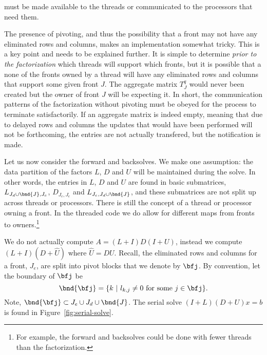 must be made available to the threads 
or communicated to the processors that need them.
\par
The presence of pivoting, and thus the possibility that a front may
not have any eliminated rows and columns, makes an implementation
somewhat tricky.
This is a key point and needs to be explained further.
It is simple to determine {\it prior to the factorization}
which threads will support which fronts, but it is possible that a
none of the fronts owned by a thread will have any eliminated rows
and columns that support some given front $J$. 
The aggregate matrix $T_J^q$ would never been created but the owner
of front $J$ will be expecting it.
In short, the communication patterns of the factorization without
pivoting must be obeyed for the process to terminate satisfactorily.
If an aggregate matrix is indeed empty, meaning that due to delayed
rows and columns the updates that would have been performed will
not be forthcoming, the entries are not actually transfered,
but the notification is made.
\par \bigskip \par
{}
\par \bigskip \par
Let us now consider the forward and backsolves.
We make one assumption: the data partition of the factors $L$, $D$
and $U$ will be maintained during the solve.
In other words, the entries in $L$, $D$ and $U$
are found in basic submatrices,
$L_{J_d \cup \bnd{J}, J_e}$, 
$D_{J_e, J_e}$ and
$L_{J_e, J_d \cup \bnd{J}}$, 
and these submatrices are not split
up across threads or processors.
There is still the concept of a thread or processor owning a front.
In the threaded code we do allow for different maps from fronts
to owners.\footnote{
For example, the forward and backsolves could be done with fewer
threads than the factorization.
}
\par
We do not actually compute $A = (L + I)D(I + U)$, instead we
compute $(L + I)(D + {\widehat U})$ where ${\widehat U} = DU$.
Recall, the eliminated rows and columns for a front, $J_e$,
are split into pivot blocks that we denote by $\bfj$.
By convention, let the boundary of $\bfj$ be
$$
\bnd{\bfj} = \{k\ |\ l_{k,j} \ne 0 \mbox{\ for some\ }j \in \bfj\}.
$$
Note, $\bnd{\bfj} \subset J_e \cup J_d \cup \bnd{J}$.
The serial solve $(I+L)(D+U)x = b$ is found in
Figure~\ref{fig:serial-solve}.
